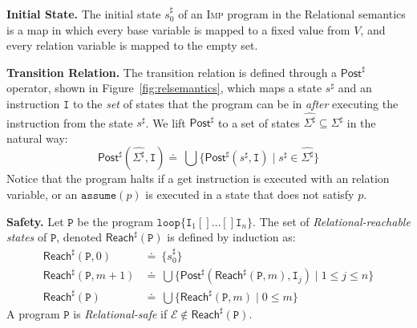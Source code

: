 \documentclass[nocopyrightspace]{sigplanconf}
\newcommand{\defeq}{\doteq\ }
\def\mypara#1{\smallskip\noindent\textbf{#1}}
\def\set#1{{\{ #1\}}}
\newcommand{\ERROR}{\mathit{Error}}
\newcommand{\ilang}{\textsc{Imp}\xspace}
\newcommand{\istate}{s}
\newcommand{\istates}{\Sigma}
\newcommand{\rstate}{\istate^{\sharp}}
\newcommand{\rstates}{\istates^{\sharp}}
\def\ASSUME{{{\mathtt{assume}}}}
\def\LOOP{{{\mathtt{loop}}}}
\def\vals{V}
\def\CHOOSE{{[\!]}}
\def\instr{\mathtt{I}}
\def\prgm{\mathtt{P}}
\def\RELSEM{{Relational}\xspace}
\def\REFREL{relation\xspace}
\def\ERROR{{\mathcal{E}}}
\def\rpost{\mathsf{Post}^{\sharp}}
\def\rreach{\mathsf{Reach}^{\sharp}}
\begin{document}
\mypara{Initial State.}
The initial state $\rstate_0$ of an \ilang program in the \RELSEM semantics is a map in which
every base variable is mapped to a fixed value from $\vals$,
and every \REFREL variable is mapped to the empty set.

\mypara{Transition Relation.}
The transition relation is defined through a $\rpost$ operator,
shown in Figure~\ref{fig:relsemantics},
which maps a state $\rstate$ and an instruction $\instr$ 
to the \emph{set} of states that the program can be in 
\emph{after} executing the instruction from the state $\rstate$.
We lift $\rpost$ to a set of states $\hat{\rstates}\subseteq \rstates$ in the natural way:
$$\rpost(\hat{\rstates}, \instr) \defeq \bigcup \set{\rpost(\rstate, \instr)\mid \rstate \in \hat{\rstates}}$$
Notice that the program halts if 
a get instruction is executed with an  \REFREL variable, or 
an $\ASSUME(p)$ is executed in a state that does not satisfy $p$.

\mypara{Safety.} 
Let $\prgm$ be the program $\LOOP\{ \instr_1 \CHOOSE \ldots \CHOOSE \instr_n \}$.
The set of \emph{\RELSEM-reachable states} of $\prgm$, denoted $\rreach(\prgm)$ is 
defined by induction as:
$$
\begin{array}{ll}
\rreach(\prgm, 0)   & \defeq  \set{\rstate_0}\\
\rreach(\prgm, m+1) & \defeq  \bigcup \set{\rpost(\rreach(\prgm, m), \instr_j) \mid 1 \leq j \leq n}\\
\rreach(\prgm)      & \defeq  \bigcup \set{\rreach(\prgm, m) \mid 0 \leq m}
\end{array}
$$
A program $\prgm$ is \emph{\RELSEM-safe} if $\ERROR \not \in\rreach(\prgm)$.
\end{document}
